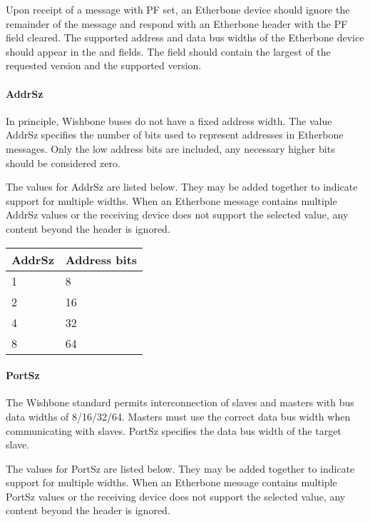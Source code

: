 \documentclass{article}
\begin{document}
Upon receipt of a message with PF set, 
an Etherbone device should ignore the remainder of the message
and respond with an Etherbone header with the PF field cleared.
The supported address and data bus widths of the Etherbone
device should appear in the  and  fields.
The  field should contain the largest of the
requested version and the supported version.

\paragraph{AddrSz} \label{field:AddrSz}

In principle, 
Wishbone buses do not have a fixed address width.
The value AddrSz specifies the number of bits used 
to represent addresses in Etherbone messages.
Only the low address bits are included,
any necessary higher bits should be considered zero.

The values for AddrSz are listed below.
They may be added together to indicate support for multiple widths.
When an Etherbone message contains multiple AddrSz values
or the receiving device does not support the selected value, 
any content beyond the header is ignored.

\vspace{1em}
\begin{tabular}{|l|l|}
\hline
AddrSz & Address bits \\
\hline
1 & 8 \\
2 & 16 \\
4 & 32 \\
8 & 64 \\
\hline
\end{tabular}

\paragraph{PortSz} \label{field:PortSz}
The Wishbone standard permits interconnection of slaves and masters 
with bus data widths of 8/16/32/64.
Masters must use the correct data bus width when communicating with slaves.
PortSz specifies the data bus width of the target slave.

The values for PortSz are listed below.
They may be added together to indicate support for multiple widths.
When an Etherbone message contains multiple PortSz values
or the receiving device does not support the selected value, 
any content beyond the header is ignored.
\end{document}
